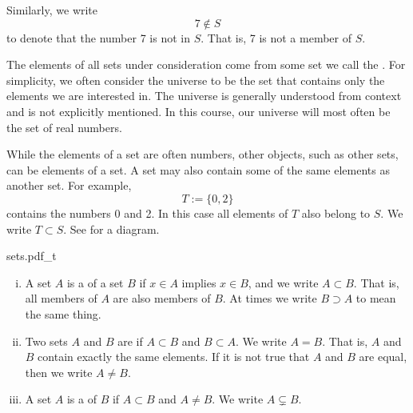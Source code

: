 Similarly, we write
\begin{equation*}
7 \notin S
\end{equation*}
to denote that the number 7 is not in $S$.  That is, 7 is not a member of
$S$.

The elements of all sets under consideration come from some set we call the
\emph{}.  For simplicity,
we often consider the universe to be the set that contains only the elements
we are interested in.
The universe is generally understood from context
and is not explicitly mentioned.  In this course, our universe will
most often be the set of real numbers.

While the elements of a set are often numbers,
other objects, such as other sets, can be elements of a set.
A set may also contain some of the same elements as another set.  For example,
\begin{equation*}
T := \{ 0, 2 \}
\end{equation*}
contains the numbers 0 and 2.  In this case all elements of $T$ also
belong to $S$.  We write $T \subset S$.
See  for a diagram.

\begin{myfigureht}
{sets.pdf_t}
\caption{A diagram of the example sets $S$ and its subset $T$.\label{fig:sets}}
\end{myfigureht}

\pagebreak[2]
\begin{defn}
\leavevmode
\begin{enumerate}[(i)]
\item
A set $A$ is a \emph{}
of a set $B$ if $x \in A$ implies $x \in B$, and we write $A \subset B$.
That is, all members of $A$ are also members of $B$.  At times we
write $B \supset A$ to mean the same thing.
\item
Two sets $A$ and $B$ are \emph{} if $A \subset B$ and $B
\subset A$.  We write $A = B$.
That is, $A$ and $B$ contain exactly the same elements.
If it is not true that $A$ and $B$ are equal, then 
we write $A \not= B$.
\item
A set $A$ is a \emph{} of $B$ if $A \subset B$
and $A \not= B$.  We write $A \subsetneq B$.
\end{enumerate}
\end{defn}

